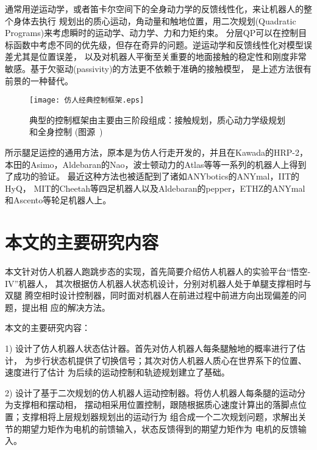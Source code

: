 通常用逆运动学\cite{kajita2003resolved}，或者笛卡尔空间下的全身动力学的反馈线性化\cite{wieber2000constrained}，来让机器人的整个身体去执行
规划出的质心运动，角动量和触地位置，用二次规划(Quadratic Programs)来考虑瞬时的运动学、动力学、力和力矩约束\cite{wieber2000constrained, kuindersma2014efficiently}。
分层QP可以在控制目标函数中考虑不同的优先级\cite{escande2014hierarchical}，但存在奇异的问题\cite{wieber2017geometric}。逆运动学和反馈线性化对模型误差尤其是位置误差，
以及对机器人平衡至关重要的地面接触的稳定性和刚度非常敏感。基于欠驱动(passivity)的方法更不依赖于准确的接触模型\cite{henze2016passivity, kurtz2020approximate}，
是上述方法很有前景的一种替代。
\begin{figure}[htbp]
    \centering
    \texttt{[image: 仿人经典控制框架.eps]}
    \caption{\label{fig:typical_control}典型的控制框架由主要由三阶段组成：接触规划，质心动力学级规划和全身控制
                (图源~\cite{carpentier2016center})}
\end{figure}
所示腿足运控的通用方法，原本是为仿人行走开发的，并且在Kawada的HRP-2\cite{takenaka2009real}，
本田的Asimo\cite{takenaka2009real}，Aldebaran的Nao\cite{gouaillier2010omni}，波士顿动力的Atlas\cite{Kuindersma2020Recent}等等一系列的机器人上得到了成功的验证。
最近这种方法也被适配到了诸如ANYbotics的ANYmal\cite{bellicoso2018dynamic}，IIT的HyQ\cite{mastalli2017trajectory}，
MIT的Cheetah\cite{di2018dynamic}等四足机器人以及Aldebaran的pepper\cite{lafaye2014linear}，ETHZ的ANYmal\cite{bjelonic2020rolling}
和Ascento\cite{klemm2020lqr}等轮足机器人上。

\section{本文的主要研究内容}
本文针对仿人机器人跑跳步态的实现，首先简要介绍仿人机器人的实验平台“悟空-IV”机器人，
其次根据仿人机器人状态机设计，分别对机器人处于单腿支撑相时与双腿
腾空相时设计控制器，同时面对机器人在前进过程中前进方向出现偏差的问题，提出相
应的解决方法。

本文的主要研究内容：

1) 设计了仿人机器人状态估计器。首先对仿人机器人每条腿触地的概率进行了估计，
为步行状态机提供了切换信号；其次对仿人机器人质心在世界系下的位置、速度进行了估计
为后续的运动控制和轨迹规划建立了基础。

2) 设计了基于二次规划的仿人机器人运动控制器。将仿人机器人每条腿的运动分为支撑相和摆动相，
摆动相采用位置控制，跟随根据质心速度计算出的落脚点位置；支撑相将上层规划器规划出的运动行为
组合成一个二次规划问题，求解出关节的期望力矩作为电机的前馈输入，状态反馈得到的期望力矩作为
电机的反馈输入。

